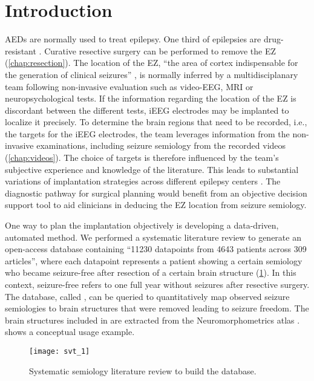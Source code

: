\section{Introduction}

\Acp{AED} are normally used to treat epilepsy.
One third of epilepsies are drug-resistant \cite{engel_what_2016}.
Curative resective surgery can be performed to remove the \ac{EZ} (\cref{chap:resection}).
The location of the \ac{EZ}, ``the area of cortex indispensable for the generation of clinical seizures'' \cite{rosenow_presurgical_2001}, is normally inferred by a multidisciplanary team following non-invasive evaluation such as video-\ac{EEG}, \ac{MRI} or neuropsychological tests.
If the information regarding the location of the \ac{EZ} is discordant between the different tests, \ac{iEEG} electrodes may be implanted to localize it precisely.
To determine the brain regions that need to be recorded, i.e., the targets for the \ac{iEEG} electrodes, the team leverages information from the non-invasive examinations, including seizure semiology from the recorded videos (\cref{chap:videos}).
The choice of targets is therefore influenced by the team's subjective experience and knowledge of the literature.
This leads to substantial variations of implantation strategies across different epilepsy centers \cite{tufenkjian_seizure_2012}.
The diagnostic pathway for surgical planning would benefit from an objective decision support tool to aid clinicians in deducing the \ac{EZ} location from seizure semiology.

One way to plan the implantation objectively is developing a data-driven, automated method.
We performed a systematic literature review to generate an open-access database containing ``11230 datapoints from 4643 patients across 309 articles'', where each datapoint represents a patient showing a certain semiology who became seizure-free after resection of a certain brain structure \cite{alim-marvasti_probabilistic_2021} (\cref{fig:semiology_review}).
In this context, seizure-free refers to one full year without seizures after resective surgery.
The database, called \svtdatabase, can be queried to quantitatively map observed seizure semiologies to brain structures that were removed leading to seizure freedom.
The brain structures included in \svtdatabase are extracted from the Neuromorphometrics atlas%
.
 shows a conceptual usage example.

\begin{figure}
  \centering
  \texttt{[image: svt\_1]}
  \caption[Systematic semiology literature review to build the \svtdatabase database]{
    Systematic semiology literature review to build the \svtdatabase database.
  }\label{fig:semiology_review}
\end{figure}

